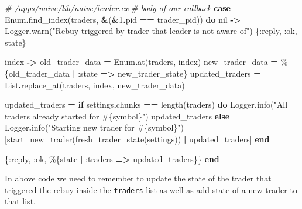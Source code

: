 \documentclass[
  oneside]{book}
\newenvironment{Shaded}{\begin{snugshade}}{\end{snugshade}}
\newcommand{\CommentTok}[1]{\textcolor[rgb]{0.56,0.35,0.01}{\textit{#1}}}
\newcommand{\ConstantTok}[1]{\textcolor[rgb]{0.00,0.00,0.00}{#1}}
\newcommand{\ControlFlowTok}[1]{\textcolor[rgb]{0.13,0.29,0.53}{\textbf{#1}}}
\newcommand{\DecValTok}[1]{\textcolor[rgb]{0.00,0.00,0.81}{#1}}
\newcommand{\KeywordTok}[1]{\textcolor[rgb]{0.13,0.29,0.53}{\textbf{#1}}}
\newcommand{\NormalTok}[1]{#1}
\newcommand{\OperatorTok}[1]{\textcolor[rgb]{0.81,0.36,0.00}{\textbf{#1}}}
\newcommand{\OtherTok}[1]{\textcolor[rgb]{0.56,0.35,0.01}{#1}}
\newcommand{\StringTok}[1]{\textcolor[rgb]{0.31,0.60,0.02}{#1}}
\newcommand{\VariableTok}[1]{\textcolor[rgb]{0.00,0.00,0.00}{#1}}
\begin{document}
\begin{Shaded}
\begin{Highlighting}[]
    \CommentTok{\# /apps/naive/lib/naive/leader.ex}
    \CommentTok{\# body of our callback}
    \KeywordTok{case} \ConstantTok{Enum}\OperatorTok{.}\NormalTok{find\_index(traders, }\OperatorTok{\&}\NormalTok{(}\OperatorTok{\&}\DecValTok{1}\OperatorTok{.}\NormalTok{pid }\OperatorTok{==}\NormalTok{ trader\_pid)) }\KeywordTok{do}
      \ConstantTok{nil} \OperatorTok{{-}\textgreater{}}
        \ConstantTok{Logger}\OperatorTok{.}\NormalTok{warn(}\StringTok{"Rebuy triggered by trader that leader is not aware of"}\NormalTok{)}
\NormalTok{        \{}\VariableTok{:reply}\NormalTok{, }\VariableTok{:ok}\NormalTok{, state\}}

\NormalTok{      index }\OperatorTok{{-}\textgreater{}}
\NormalTok{        old\_trader\_data }\OperatorTok{=} \ConstantTok{Enum}\OperatorTok{.}\NormalTok{at(traders, index)}
\NormalTok{        new\_trader\_data }\OperatorTok{=}\NormalTok{ \%\{old\_trader\_data }\OperatorTok{|} \VariableTok{:state} \OperatorTok{=\textgreater{}}\NormalTok{ new\_trader\_state\}}
\NormalTok{        updated\_traders }\OperatorTok{=} \ConstantTok{List}\OperatorTok{.}\NormalTok{replace\_at(traders, index, new\_trader\_data)}

\NormalTok{        updated\_traders }\OperatorTok{=}
          \ControlFlowTok{if}\NormalTok{ settings}\OperatorTok{.}\NormalTok{chunks }\OperatorTok{==}\NormalTok{ length(traders) }\KeywordTok{do}
            \ConstantTok{Logger}\OperatorTok{.}\NormalTok{info(}\StringTok{"All traders already started for }\OtherTok{\#\{}\NormalTok{symbol}\OtherTok{\}}\StringTok{"}\NormalTok{)}
\NormalTok{            updated\_traders}
          \ControlFlowTok{else}
            \ConstantTok{Logger}\OperatorTok{.}\NormalTok{info(}\StringTok{"Starting new trader for }\OtherTok{\#\{}\NormalTok{symbol}\OtherTok{\}}\StringTok{"}\NormalTok{)}
\NormalTok{            [start\_new\_trader(fresh\_trader\_state(settings)) }\OperatorTok{|}\NormalTok{ updated\_traders]}
          \KeywordTok{end}

\NormalTok{        \{}\VariableTok{:reply}\NormalTok{, }\VariableTok{:ok}\NormalTok{, \%\{state }\OperatorTok{|} \VariableTok{:traders} \OperatorTok{=\textgreater{}}\NormalTok{ updated\_traders\}\}}
    \KeywordTok{end}
\end{Highlighting}
\end{Shaded}

In above code we need to remember to update the state of the trader that triggered the rebuy inside the \texttt{traders} list as well as add state of a new trader to that list.
\end{document}

